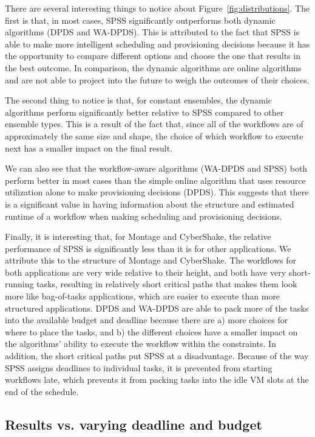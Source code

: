 \documentclass[preprint,5p]{elsarticle}
\begin{document}
There are several interesting things to notice about
Figure~\ref{fig:distributions}. The first is that, in most cases, SPSS
significantly outperforms both dynamic algorithms (DPDS and WA-DPDS). This is
attributed to the fact that SPSS is able to make more intelligent scheduling
and provisioning decisions because it has the opportunity to compare different
options and choose the one that results in the best outcome. In comparison,
the dynamic algorithms are online algorithms and are not able to project into
the future to weigh the outcomes of their choices.

The second thing to notice is that, for constant ensembles, the dynamic
algorithms perform significantly better relative to SPSS compared to  other
ensemble types. This is a result of the fact that, since all of the workflows
are of approximately the same size and shape, the choice of which workflow to
execute next has a smaller impact on the final result.

We can also see that the workflow-aware
algorithms (WA-DPDS and SPSS) both perform better in most cases than the
simple online algorithm that uses resource utilization alone to make
provisioning decisions (DPDS). This suggests that there is a significant value
in having information about the structure and estimated runtime of a workflow
when making scheduling and provisioning decisions.

Finally, it is interesting that, for Montage and CyberShake, the
relative performance of SPSS is significantly less than it is for other
applications. We attribute this to the structure of Montage and CyberShake.
The workflows for both applications are very wide relative to their height,
and both have very short-running tasks, resulting  in relatively short
critical paths that makes them look more like bag-of-tasks applications, which are easier
to execute than more structured applications. DPDS and WA-DPDS are able to
pack more of the tasks into the available budget and deadline because there
are a) more choices for where to place the tasks, and b) the different choices
have a smaller impact on the algorithms' ability to execute the workflow
within the constraints. In addition, the short critical paths put SPSS at a
disadvantage. Because of the way SPSS assigns deadlines to individual tasks,
it is prevented from starting workflows late, which prevents it from packing
tasks into the idle VM slots at the end of the schedule.

\subsection{Results vs. varying deadline and budget}
\end{document}
